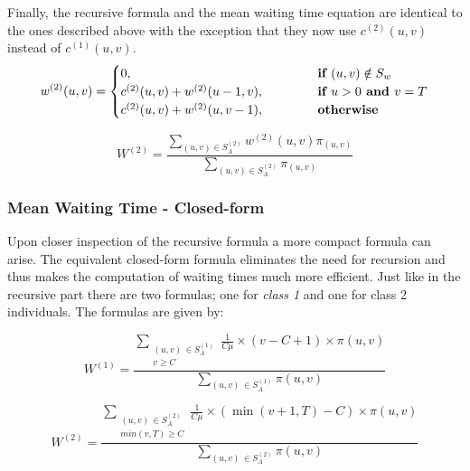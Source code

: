 Finally, the recursive formula and the mean waiting time equation are identical 
to the ones described above with the exception that they now use \(c^{(2)}(u,v)\) 
instead of \(c^{(1)}(u,v)\).
\begin{equation} \label{eq:waiting-time-at-each-state-ambulance}
    w^{(2)}(u,v) = 
    \begin{cases} 
        0, \hspace{4.85cm} & \textbf{if } (u,v) \notin S_w \\
        c^{(2)}(u,v) + w^{(2)}(u-1, v), & \textbf{if } u > 0 \textbf{ and } v = T \\
        c^{(2)}(u,v) + w^{(2)}(u, v-1), & \textbf{otherwise}
    \end{cases}
\end{equation}

\begin{equation}\label{eq:recursive-waiting-time-ambulance}
    W^{(2)} = \frac{\sum_{(u,v) \in S_A^{(2)}} w^{(2)}(u,v) \pi_{(u,v)}}
    {\sum_{(u,v) \in S_A^{(2)}} \pi_{(u,v)}}
\end{equation}

\subsubsection{Mean Waiting Time - Closed-form}
Upon closer inspection of the recursive formula a more compact formula can arise. 
The equivalent closed-form formula eliminates the need for recursion and thus makes 
the computation of waiting times much more efficient. 
Just like in the recursive part there are two formulas; one for \textit{class 1} 
and one for class 2 individuals. 
The formulas are given by:

\begin{equation} \label{eq:closed_form_waiting_others}
    W^{(1)} = \frac{\sum_{\substack{(u,v) \, \in S_A^{(1)} \\ v \geq C}} 
    \frac{1}{C \mu} \times (v-C+1) \times \pi(u,v)}{\sum_{(u,v) \, 
    \in S_A^{(1)}} \pi(u,v)}
\end{equation}
    
\begin{equation}\label{eq:closed_form_waiting_ambulance}
    W^{(2)} = \frac{\sum_{\substack{(u,v) \, \in S_A^{(2)} \\ min(v,T) \geq C}} 
    \frac{1}{C \mu} \times (\min(v+1,T)-C) \times \pi(u,v)}{\sum_{(u,v) \, 
    \in S_A^{(2)}} \pi(u,v)}
\end{equation}

